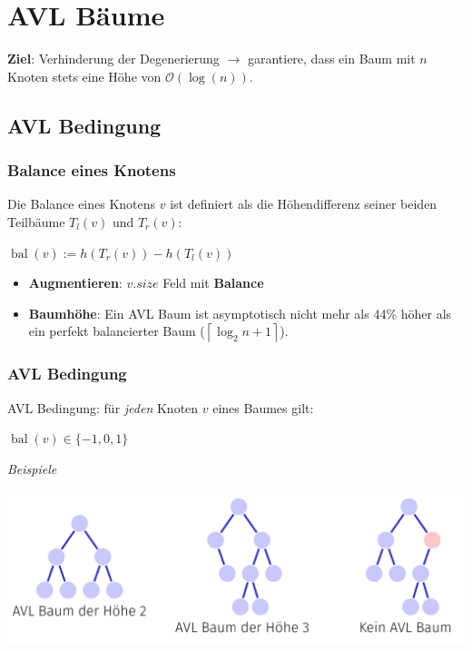 \section{AVL Bäume}

\begin{sectionbox}
\textbf{Ziel}: Verhinderung der Degenerierung $\rightarrow$ garantiere, dass ein Baum mit $n$ Knoten stets eine Höhe von $\mathcal{O}(\operatorname{log}(n))$.\par\smallskip
\subsection{AVL Bedingung}\smallskip
\subsubsection{Balance eines Knotens}\smallskip
Die Balance eines Knotens $v$ ist definiert als die Höhendifferenz seiner beiden Teilbäume $T_{l}(v)$ und $T_{r}(v)$:\par\smallskip
\begin{center}
    $\operatorname{bal}(v):=h\left(T_{r}(v)\right)-h\left(T_{l}(v)\right)$
\end{center}\par\smallskip
\begin{itemize}
    \item \textbf{Augmentieren}: $v.size$ Feld mit \textbf{Balance}
    \item \textbf{Baumhöhe}: Ein AVL Baum ist asymptotisch nicht mehr als 44\% höher als ein perfekt balancierter Baum ($\left\lceil\log _{2} n+1\right\rceil$).
\end{itemize}\par\smallskip

\subsubsection{AVL Bedingung}\smallskip
AVL Bedingung: für \textit{jeden} Knoten $v$ eines Baumes gilt:\par\smallskip
\begin{center}
    $\operatorname{bal}(v) \in\{-1,0,1\}$
\end{center}\par\smallskip

\textit{Beispiele}\par
\begin{center}
    \includegraphics[width = \columnwidth]{../img/BspAVLHoehen.png}
\end{center}


\end{sectionbox}

